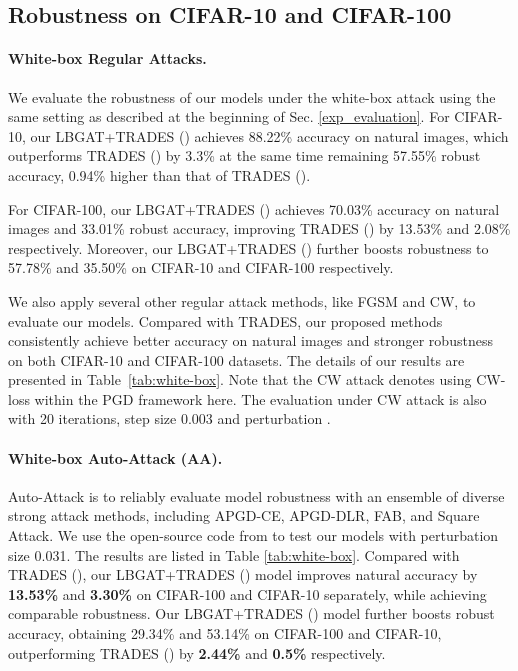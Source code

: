 \documentclass[10pt,twocolumn,letterpaper]{article}
\begin{document}
\subsection{Robustness on CIFAR-10 and CIFAR-100}
\label{sec:4.1}
\paragraph{White-box Regular Attacks.}
We evaluate the robustness of our models under the white-box attack using the same setting as described at the beginning of Sec. \ref{exp_evaluation}. 
For CIFAR-10, our LBGAT+TRADES () achieves 88.22\% accuracy on natural images, which outperforms TRADES () by 3.3\% at the same time remaining 57.55\% robust accuracy, 0.94\% higher than that of TRADES (). 

For CIFAR-100, our LBGAT+TRADES () achieves 70.03\% accuracy on natural images and 33.01\% robust accuracy, improving TRADES () by 13.53\% and 2.08\% respectively. 
Moreover, our LBGAT+TRADES () further boosts robustness to 57.78\% and 35.50\% on CIFAR-10 and CIFAR-100 respectively. 

We also apply several other regular attack methods, like FGSM and CW, to evaluate our models. Compared with TRADES, our proposed methods consistently achieve better accuracy on natural images and stronger robustness on both CIFAR-10 and CIFAR-100 datasets. The details of our results are presented in Table~\ref{tab:white-box}. Note that the CW attack denotes using CW-loss within the PGD framework here. The evaluation under CW attack is also with 20 iterations, step size 0.003 and perturbation . 

\paragraph{White-box Auto-Attack (AA).}
\vspace{-0.1in}
Auto-Attack \cite{croce2020reliable} is to reliably evaluate model robustness with an ensemble of diverse strong attack methods, including APGD-CE, APGD-DLR, FAB, and Square Attack. We use the open-source code from \cite{croce2020reliable} to test our models with perturbation size 0.031. The results are listed in Table \ref{tab:white-box}. Compared with TRADES (), our LBGAT+TRADES () model improves natural accuracy by \textbf{13.53\%} and \textbf{3.30\%} on CIFAR-100 and CIFAR-10 separately, while achieving comparable robustness.
Our LBGAT+TRADES () model further boosts robust accuracy, obtaining 29.34\% and 53.14\% on CIFAR-100 and CIFAR-10, outperforming TRADES () by \textbf{2.44\%} and \textbf{0.5\%} respectively.
\end{document}
